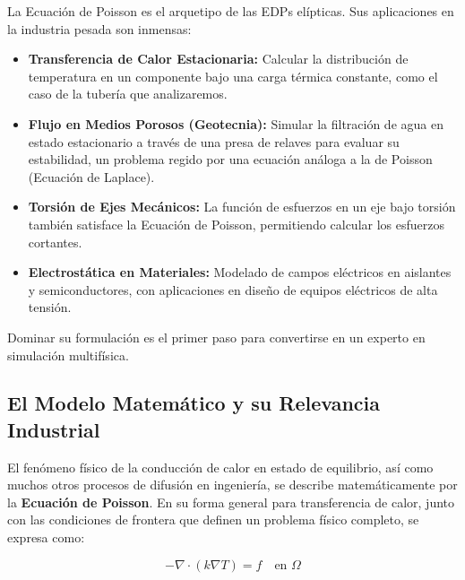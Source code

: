 \begin{center}
\begin{tcolorbox}[colback=blue!5!white,colframe=blue!75!black,title=CONTEXTO INGENIERIL,fonttitle=\bfseries]
La Ecuación de Poisson es el arquetipo de las EDPs elípticas. Sus aplicaciones en la industria pesada son inmensas:\\

\begin{itemize}
    \item \textbf{Transferencia de Calor Estacionaria:} Calcular la distribución de temperatura en un componente bajo una carga térmica constante, como el caso de la tubería que analizaremos.
    \item \textbf{Flujo en Medios Porosos (Geotecnia):} Simular la filtración de agua en estado estacionario a través de una presa de relaves para evaluar su estabilidad, un problema regido por una ecuación análoga a la de Poisson (Ecuación de Laplace).
    \item \textbf{Torsión de Ejes Mecánicos:} La función de esfuerzos en un eje bajo torsión también satisface la Ecuación de Poisson, permitiendo calcular los esfuerzos cortantes.
    \item \textbf{Electrostática en Materiales:} Modelado de campos eléctricos en aislantes y semiconductores, con aplicaciones en diseño de equipos eléctricos de alta tensión.
\end{itemize}

\end{tcolorbox}
\end{center}

Dominar su formulación es el primer paso para convertirse en un experto en simulación multifísica.

\subsection{El Modelo Matemático y su Relevancia Industrial}
\label{subsec:poisson-relevance-consolidated}

El fenómeno físico de la conducción de calor en estado de equilibrio, así como muchos otros procesos de difusión en ingeniería, se describe matemáticamente por la \textbf{Ecuación de Poisson}. En su forma general para transferencia de calor, junto con las condiciones de frontera que definen un problema físico completo, se expresa como:

\begin{equation}
    -\nabla \cdot (k \nabla T) = f \quad \text{en } \Omega
    \label{eq:poisson-general-intro}
\end{equation}

